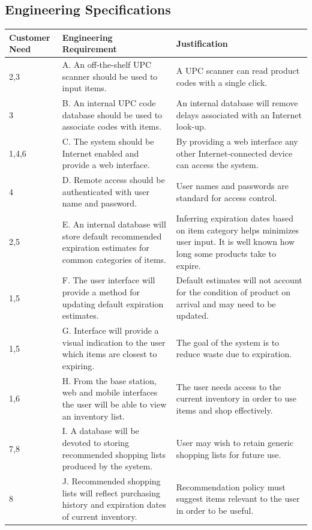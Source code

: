 \documentclass[11pt]{article} %
\begin{document}
\subsection{Engineering Specifications}
\begin{table}[h!]
\begin{center}
\begin{tabular}{| p{1.2in} | p{2.5in} |p{2.5in} |}
\hline
Customer Need & Engineering Requirement & Justification \\
\hline
2,3 &A. An off-the-shelf UPC scanner should be used to input items. & A UPC scanner can read product codes with a single click.\\
\hline
3 &B. An internal UPC code database should be used to associate codes with items.&An internal database will remove delays associated with an Internet look-up.\\
\hline
1,4,6&C. The system should be Internet enabled and provide a web interface.&By providing a web interface any other Internet-connected device can access the system.\\
\hline
4&D. Remote access should be authenticated with user name and password.&User names and passwords are standard for access control.\\
\hline
2,5&E. An internal database will store default recommended expiration estimates for common categories of items.&Inferring expiration dates based on item category helps minimizes user input. It is well known how long some products take to expire.\\
\hline
1,5&F. The user interface will provide a method for updating default expiration estimates.&Default estimates will not account for the condition of product on arrival and may need to be updated.\\
\hline
1,5&G. Interface will provide a visual indication to the user which items are closest to expiring.&The goal of the system is to reduce waste due to expiration.\\
\hline
1,6&H. From the base station, web and mobile interfaces the user will be able to view an inventory list.&The user needs access to the current inventory in order to use items and shop effectively.\\
\hline
7,8&I. A database will be devoted to storing recommended shopping lists produced by the system.&User may wish to retain generic shopping lists for future use.\\
\hline
8&J. Recommended shopping lists will reflect purchasing history and expiration dates of current inventory.&Recommendation policy must suggest items relevant to the user in order to be useful.\\

\end{tabular}
\end{center}
\end{table}
\end{document}
